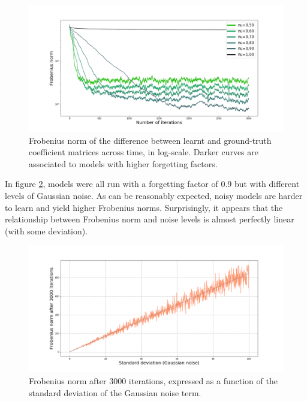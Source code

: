 \begin{figure}[H]
    \begin{center}
        \includegraphics[width=\textwidth, keepaspectratio]{imgs/frobenius.png}
        \caption{Frobenius norm of the difference between learnt and ground-truth
            coefficient matrices across time, in log-scale. Darker curves are associated
            to models with higher forgetting factors.}
        \label{frobenius}
    \end{center}
\end{figure}


In figure \ref{stdv}, models were all run with a forgetting factor of 0.9 but
with different levels of Gaussian noise.
As can be reasonably expected, noisy models are harder to learn and yield
higher Frobenius norms. Surprisingly, it appears that
the relationship between Frobenius norm and noise levels is almost perfectly linear
(with some deviation).

\begin{figure}[H]
    \begin{center}
        \includegraphics[width=\textwidth, keepaspectratio]{imgs/stdv.png}
        \caption{Frobenius norm after 3000 iterations, expressed as a function of
            the standard deviation of the Gaussian noise term.}
        \label{stdv}
    \end{center}
\end{figure}

